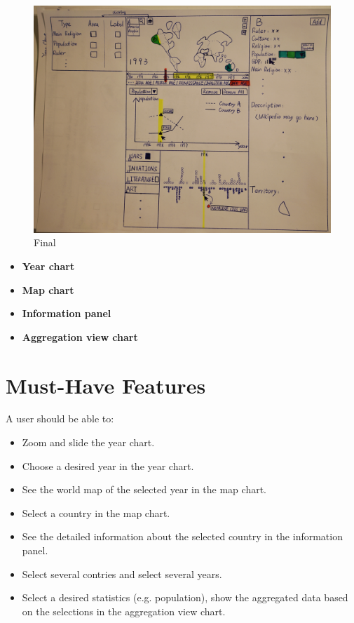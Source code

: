 \documentclass[12pt, fullpage,letterpaper]{article}
\begin{document}
\begin{figure}[h!]
    \begin{center}
        \includegraphics[width=\textwidth]{final.JPG}
        \caption{Final}
        \label{fig:final}
    \end{center}
\end{figure}

\begin{itemize}
    \item \textbf{Year chart}
    \item \textbf{Map chart}
    \item \textbf{Information panel}
    \item \textbf{Aggregation view chart}
\end{itemize}

\section{Must-Have Features}
A user should be able to:
\begin{itemize}
    \item Zoom and slide the year chart.
    \item Choose a desired year in the year chart. 
    \item See the world map of the selected year in the map chart.
    \item Select a country in the map chart.
    \item See the detailed information about the selected country in the information panel.
    \item Select several contries and select several years.
    \item Select a desired statistics (e.g. population), show the aggregated data based on the selections in the aggregation view chart.
\end{itemize}
\end{document}
